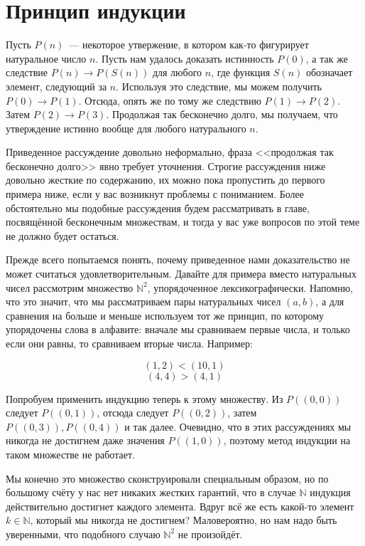 \section{Принцип индукции}

Пусть $P(n)$~--- некоторое утвержение, в котором как-то фигурирует натуральное число $n$. Пусть нам удалось доказать истинность $P(0)$, а так же следствие $P(n)\to P(S(n))$ для любого $n$, где функция $S(n)$ обозначает элемент, следующий за $n$. Используя это следствие, мы можем получить $P(0)\to P(1)$. Отсюда, опять же по тому же следствию $P(1)\to P(2)$. Затем $P(2)\to P(3)$. Продолжая так бесконечно долго, мы получаем, что утверждение истинно вообще для любого натурального $n$.

Приведенное рассуждение довольно неформально, фраза <<продолжая так бесконечно долго>> явно требует уточнения. Строгие рассуждения ниже довольно жесткие по содержанию, их можно пока пропустить до первого примера ниже, если у вас возникнут проблемы с пониманием. Более обстоятельно мы подобные рассуждения будем рассматривать в главе, посвящённой бесконечным множествам, и тогда у вас уже вопросов по этой теме не должно будет остаться.

Прежде всего попытаемся понять, почему приведенное нами доказательство не может считаться удовлетворительным. Давайте для примера вместо натуральных чисел рассмотрим множество $\mathbb{N}^2$, упорядоченное лексикографически. Напомню, что это значит, что мы рассматриваем пары натуральных чисел $(a, b)$, а для сравнения на больше и меньше используем тот же принцип, по которому упорядочены слова в алфавите: вначале мы сравниваем первые числа, и только если они равны, то сравниваем вторые числа. Например:

$$(1, 2) < (10, 1)$$
$$(4, 4) > (4, 1)$$

Попробуем применить индукцию теперь к этому множеству. Из $P((0, 0))$ следует $P((0, 1))$, отсюда следует $P((0, 2))$, затем $P((0, 3)), P((0, 4))$ и так далее. Очевидно, что в этих рассуждениях мы никогда не достигнем даже значения $P((1, 0))$, поэтому метод индукции на таком множестве не работает.

Мы конечно это множество сконструировали специальным образом, но по большому счёту у нас нет никаких жестких гарантий, что в случае $\mathbb{N}$ индукция действительно достигнет каждого элемента. Вдруг всё же есть какой-то элемент $k\in \mathbb{N}$, который мы никогда не достигнем? Маловероятно, но нам надо быть уверенными, что подобного случаю $\mathbb{N}^2$ не произойдёт.

